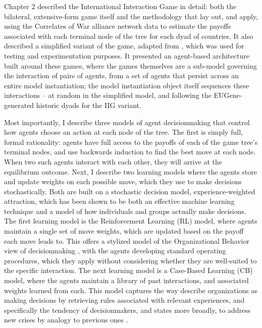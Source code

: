 Chapter 2 described the International Interaction Game in detail: both the bilateral, extensive-form game itself and the methodology that \citet{bdm_1992} lay out, and \citet{bennett_2000b} apply, using the Correlates of War alliance network data to estimate the payoffs associated with each terminal node of the tree for each dyad of countries. It also described a simplified variant of the game, adapted from \citet{signorino_1999}, which was used for testing and experimentation purposes. It presented an agent-based architecture built around these games, where the games themselves are a sub-model governing the interaction of pairs of agents, from a set of agents that persist across an entire model instantiation; the model instantiation object itself sequences these interactions -- at random in the simplified model, and following the EUGene-generated historic dyads for the IIG variant.

Most importantly, I describe three models of agent decisionmaking that control how agents choose an action at each node of the tree. The first is simply full, formal rationality: agents have full access to the payoffs of each of the game tree's terminal nodes, and use backwards induction to find the best move at each node. When two such agents interact with each other, they will arrive at the equilibrium outcome. Next, I describe two learning models where the agents store and update weights on each possible move, which they use to make decisions stochastically. Both are built on a stochastic decision model, experience-weighted attraction, which has been shown to be both an effective machine learning technique and a model of how individuals and groups actually make decisions. The first learning model is the Reinforcement Learning (RL) model, where agents maintain a single set of move weights, which are updated based on the payoff each move leads to. This offers a stylized model of the Organizational Behavior view of decisionmaking \citep{allison_1999}, with the agents developing standard operating procedures, which they apply without considering whether they are well-suited to the specific interaction. The next learning model is a Case-Based Learning (CB) model, where the agents maintain a library of past interactions, and associated weights learned from each. This model captures the way \citet{march_1993} describe organizations as making decisions by retrieving rules associated with relevant experiences, and specifically the tendency of decisionmakers, and states more broadly, to address new crises by analogy to previous ones \citep{khong_1992,schuman_1992}.

